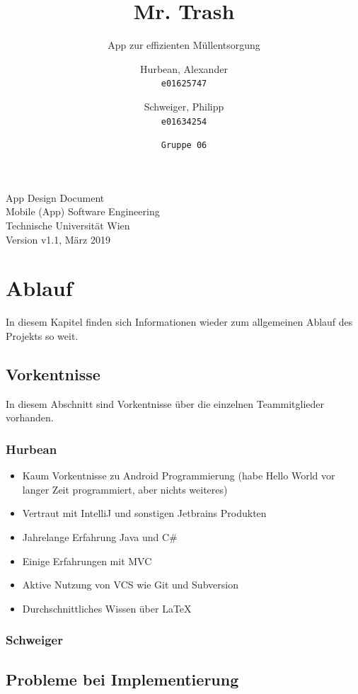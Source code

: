 \documentclass{mrtrash}
\title{\vspace{-1cm}Mr. Trash}
\subtitle{App zur effizienten Müllentsorgung}
\author{
    Hurbean, Alexander\\
    \texttt{e01625747}
    \and
    Schweiger, Philipp\\
    \texttt{e01634254}
    \and
    \texttt{Gruppe 06}}
\begin{document}
\maketitle

\null\vfill
\noindent
App Design Document\\ 
Mobile (App) Software Engineering\\
Technische Universität Wien\\
Version v1.1, März 2019
\newpage

\tableofcontents

\chapter{Ablauf}

In diesem Kapitel finden sich Informationen wieder zum allgemeinen Ablauf des Projekts so weit.

\section{Vorkentnisse}

In diesem Abschnitt sind Vorkentnisse über die einzelnen Teammitglieder vorhanden.

\subsection{Hurbean}

\begin{itemize}
    \item Kaum Vorkentnisse zu Android Programmierung (habe Hello World vor langer Zeit programmiert, aber nichts weiteres)
    \item Vertraut mit IntelliJ und sonstigen Jetbrains Produkten
    \item Jahrelange Erfahrung Java und C\#
    \item Einige Erfahrungen mit MVC
    \item Aktive Nutzung von VCS wie Git und Subversion
    \item Durchschnittliches Wissen über \LaTeX
\end{itemize}

\subsection{Schweiger}

\section{Probleme bei Implementierung}
\end{document}
